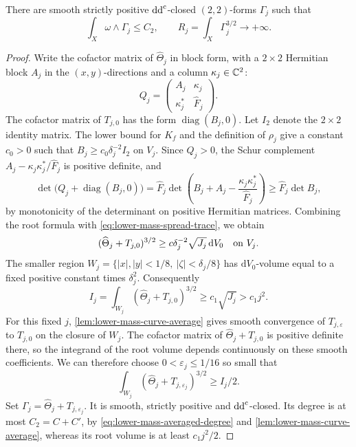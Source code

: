 \begin{lemma}\label{lem:lower-mass-unbounded-root}
There are smooth strictly positive $\mathrm{dd}^{\mathrm{c}}$-closed $(2,2)$-forms $\Gamma_j$ such that
\[
 \int_X\omega\wedge\Gamma_j\leq C_2,\qquad
 R_j=\int_X\Gamma_j^{3/2}\longrightarrow+\infty.
\]
\end{lemma}
\begin{proof}
Write the cofactor matrix of $\widehat\Theta_j$ in block form, with a $2\times2$ Hermitian block $A_j$ in the $(x,y)$-directions and a column $\kappa_j\in\mathbb C^2$:
\[
 Q_j=\begin{pmatrix}A_j&\kappa_j\\\kappa_j^*&\widehat F_j\end{pmatrix}.
\]
The cofactor matrix of $T_{j,0}$ has the form $\operatorname{diag}(B_j,0)$. Let $I_2$ denote the $2\times2$ identity matrix. The lower bound for $K_f$ and the definition of $\rho_j$ give a constant $c_0>0$ such that $B_j\geq c_0\delta_j^{-2}I_2$ on $V_j$. Since $Q_j>0$, the Schur complement $A_j-\kappa_j\kappa_j^*/\widehat F_j$ is positive definite, and
\[
 \det\bigl(Q_j+\operatorname{diag}(B_j,0)\bigr)
 =\widehat F_j\det\left(B_j+A_j-
             \frac{\kappa_j\kappa_j^*}{\widehat F_j}\right)
 \geq\widehat F_j\det B_j,
\]
by monotonicity of the determinant on positive Hermitian matrices. Combining the root formula with \eqref{eq:lower-mass-spread-trace}, we obtain
\[
 (\widehat\Theta_j+T_{j,0})^{3/2}
       \geq c\delta_j^{-2}\sqrt{J_j}\,\mathrm{d}V_0
       \quad\hbox{on }V_j.
\]
The smaller region $W_j=\{|x|,|y|<1/8,\ |\zeta|<\delta_j/8\}$ has $\mathrm{d}V_0$-volume equal to a fixed positive constant times $\delta_j^2$. Consequently
\[
 I_j=\int_{W_j}(\widehat\Theta_j+T_{j,0})^{3/2}
       \geq c_1\sqrt{J_j}>c_1j^2.
\]
For this fixed $j$, \cref{lem:lower-mass-curve-average} gives smooth convergence of $T_{j,\varepsilon}$ to $T_{j,0}$ on the closure of $W_j$. The cofactor matrix of $\widehat\Theta_j+T_{j,0}$ is positive definite there, so the integrand of the root volume depends continuously on these smooth coefficients. We can therefore choose $0<\varepsilon_j\leq1/16$ so small that
\[
 \int_{W_j}(\widehat\Theta_j+T_{j,\varepsilon_j})^{3/2}
       \geq I_j/2.
\]
Set $\Gamma_j=\widehat\Theta_j+T_{j,\varepsilon_j}$. It is smooth, strictly positive and $\mathrm{dd}^{\mathrm{c}}$-closed. Its degree is at most $C_2=C+C'$, by \eqref{eq:lower-mass-averaged-degree} and \cref{lem:lower-mass-curve-average}, whereas its root volume is at least $c_1j^2/2$.
\end{proof}

